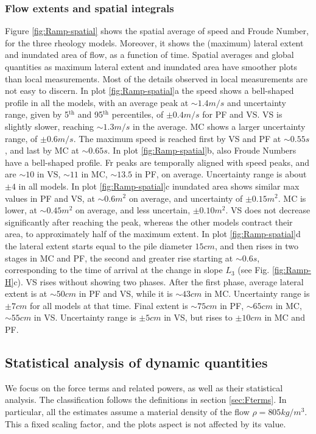 \documentclass{article}
\begin{document}
\subsubsection{Flow extents and spatial integrals}
Figure \ref{fig:Ramp-spatial} shows the spatial average of speed and Froude Number, for the three rheology models. Moreover, it shows the (maximum) lateral extent and inundated area of flow, as a function of time. Spatial averages and global quantities as maximum lateral extent and inundated area have smoother plots than local measurements. Most of the details observed in local measurements are not easy to discern. In plot \ref{fig:Ramp-spatial}a the speed shows a bell-shaped profile in all the models, with an average peak at $\sim 1.4 m/s$ and uncertainty range, given by 5$^{\mathrm{th}}$ and 95$^{\mathrm{th}}$ percentiles, of $\pm 0.4 m/s$ for PF and VS. VS is slightly slower, reaching $\sim 1.3 m/s$ in the average. MC shows a larger uncertainty range, of $\pm 0.6 m/s$. The maximum speed is reached first by VS and PF at $\sim 0.55 s$, and last by MC at $\sim 0.65 s$. In plot \ref{fig:Ramp-spatial}b, also Froude Numbers have a bell-shaped profile. Fr peaks are temporally aligned with speed peaks, and are $\sim 10$ in VS, $\sim 11$ in MC, $\sim 13.5$ in PF, on average. Uncertainty range is about $\pm 4$ in all models. In plot \ref{fig:Ramp-spatial}c inundated area shows similar max values in PF and VS, at $\sim 0.6 m^2$ on average, and uncertainty of $\pm 0.15 m^2$. MC is lower, at $\sim 0.45 m^2$ on average, and less uncertain, $\pm 0.10 m^2$. VS does not decrease significantly after reaching the peak, whereas the other models contract their area, to approximately half of the maximum extent. In plot \ref{fig:Ramp-spatial}d the lateral extent starts equal to the pile diameter $15 cm$, and then rises in two stages in MC and PF, the second and greater rise starting at $\sim 0.6 s$, corresponding to the time of arrival at the change in slope $L_3$ (see Fig. \ref{fig:Ramp-H}c). VS rises without showing two phases. After the first phase, average lateral extent is at $\sim 50 cm$ in PF and VS, while it is $\sim 43 cm$ in MC. Uncertainty range is $\pm 7 cm$ for all models at that time. Final extent is $\sim 75 cm$ in PF, $\sim 65 cm$ in MC, $\sim 55 cm$ in VS. Uncertainty range is $\pm 5 cm$ in VS, but rises to $\pm 10 cm$ in MC and PF.

\subsection{Statistical analysis of dynamic quantities}\label{Hq1}
We focus on the force terms and related powers, as well as their statistical analysis. The classification follows the definitions in section \ref{sec:Fterms}. In particular, all the estimates assume a material density of the flow $\rho = 805 kg/m^3$. This a fixed scaling factor, and the plots aspect is not affected by its value.
\end{document}
